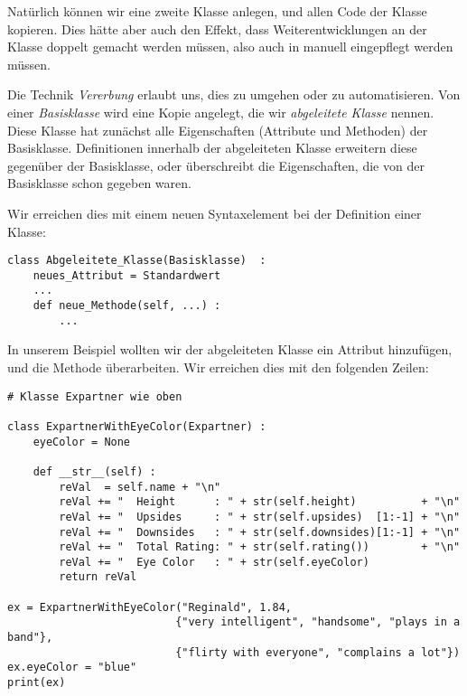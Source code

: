 Natürlich können wir eine zweite Klasse  anlegen, und allen Code der Klasse  kopieren. Dies hätte aber auch den Effekt, dass Weiterentwicklungen an der Klasse  doppelt gemacht werden müssen, also auch in  manuell eingepflegt werden müssen.

Die Technik \emph{Vererbung} erlaubt uns, dies zu umgehen oder zu automatisieren. Von einer \emph{Basisklasse} wird eine Kopie angelegt, die wir \emph{abgeleitete Klasse} nennen. Diese Klasse hat zunächst alle Eigenschaften (\ie Attribute und Methoden) der Basisklasse. Definitionen innerhalb der abgeleiteten Klasse erweitern diese gegenüber der Basisklasse, oder überschreibt die Eigenschaften, die von der Basisklasse schon gegeben waren.

Wir erreichen dies mit einem neuen Syntaxelement bei der Definition einer Klasse:
\begin{codebox}
\begin{verbatim}
class Abgeleitete_Klasse(Basisklasse)  :
    neues_Attribut = Standardwert
    ...
    def neue_Methode(self, ...) :
        ...
\end{verbatim}
\end{codebox}

In unserem Beispiel wollten wir der abgeleiteten Klasse  ein Attribut  hinzufügen, und die Methode   überarbeiten. Wir erreichen dies mit den folgenden Zeilen:

\begin{codebox}
\begin{verbatim}
# Klasse Expartner wie oben

class ExpartnerWithEyeColor(Expartner) :
    eyeColor = None
        
    def __str__(self) :
        reVal  = self.name + "\n"
        reVal += "  Height      : " + str(self.height)          + "\n"
        reVal += "  Upsides     : " + str(self.upsides)  [1:-1] + "\n"
        reVal += "  Downsides   : " + str(self.downsides)[1:-1] + "\n"
        reVal += "  Total Rating: " + str(self.rating())        + "\n"
        reVal += "  Eye Color   : " + str(self.eyeColor)
        return reVal

ex = ExpartnerWithEyeColor("Reginald", 1.84,
                          {"very intelligent", "handsome", "plays in a band"},
                          {"flirty with everyone", "complains a lot"})
ex.eyeColor = "blue"
print(ex)
\end{verbatim}
\end{codebox}

